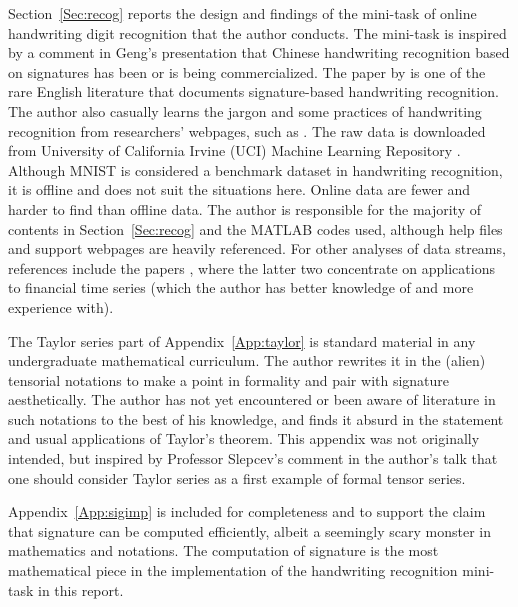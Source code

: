 \documentclass[fleqn]{article}
\theoremstyle{definition}
\theoremstyle{remark}
\begin{document}
\par
Section~\ref{Sec:recog} reports the design and findings of the mini-task of online handwriting digit recognition that the author conducts. The mini-task is inspired by a comment in Geng's presentation \cite{Geng2016CCF} that Chinese handwriting recognition based on signatures has been or is being commercialized. The paper by \citet{Graham2013} is one of the rare English literature that documents signature-based handwriting recognition. The author also casually learns the jargon and some practices of handwriting recognition from researchers' webpages, such as \citet{mnist,MATLAB:2009,MATLAB:2016}. The raw data is downloaded from University of California Irvine (UCI) Machine Learning Repository \cite{UJIchar,UJIdigit}. Although MNIST \cite{mnist} is considered a benchmark dataset in handwriting recognition, it is offline and does not suit the situations here. Online data are fewer and harder to find than offline data. The author is responsible for the majority of contents in Section~\ref{Sec:recog} and the MATLAB codes used, although \citet{MATLAB:2009,MATLAB:2016} help files and support webpages are heavily referenced. For other analyses of data streams, references include the papers \citet{lyons2014ICM,lyons2014HFT,SigFin}, where the latter two concentrate on applications to financial time series (which the author has better knowledge of and more experience with).

\par
The Taylor series part of Appendix~\ref{App:taylor} is standard material in any undergraduate mathematical curriculum. The author rewrites it in the (alien) tensorial notations to make a point in formality and pair with signature aesthetically. The author has not yet encountered or been aware of literature in such notations to the best of his knowledge, and finds it absurd in the statement and usual applications of Taylor's theorem. This appendix was not originally intended, but inspired by Professor Slepcev's comment in the author's talk that one should consider Taylor series as a first example of formal tensor series.

\par
Appendix~\ref{App:sigimp} is included for completeness and to support the claim that signature can be computed efficiently, albeit a seemingly scary monster in mathematics and notations. The computation of signature is the most mathematical piece in the implementation of the handwriting recognition mini-task in this report.


{}

\end{document}
